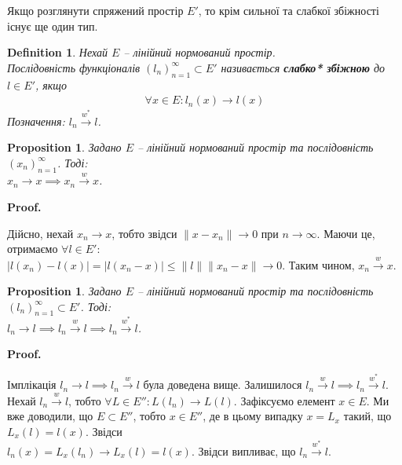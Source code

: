 \documentclass[a4paper, 10pt]{article}
\makeatletter
\theoremstyle{theoremdd}
\theoremstyle{theoremdd}
\newtheorem{definition}[theorem]{Definition}
\theoremstyle{theoremdd}
\theoremstyle{theoremdd}
\theoremstyle{theoremdd}
\newtheorem{proposition}[theorem]{Proposition}
\theoremstyle{theoremdd}
\theoremstyle{theoremdd}
\theoremstyle{theoremdd}
\newcommand{\toweak}{\overset{w}{\to}}
\newcommand{\toweakstar}{\overset{w^*}{\to}}
\renewenvironment{proof}[1][Proof.\\]{\par
\pushQED{\hfill \qed}%
\normalfont \topsep6\p@\@plus6\p@\relax
\trivlist
\item\relax
{\bfseries
#1\@addpunct{.}}\hspace\labelsep\ignorespaces
}{%
\popQED\endtrivlist\@endpefalse
}
\makeatother
\begin{document}
Якщо розглянути спряжений простір $E'$, то крім сильної та слабкої збіжності існує ще один тип.

\begin{definition}
Нехай $E$ -- лінійний нормований простір.\\
Послідовність функціоналів $(l_n)_{n=1}^\infty \subset E'$ називається \textbf{слабко* збіжною} до $l \in E'$, якщо
\begin{align*}
\forall x \in E: l_n(x) \to l(x)
\end{align*}
Позначення: $l_n \toweakstar l$.
\end{definition}

\begin{proposition}
Задано $E$ -- лінійний нормований простір та послідовність $(x_n)_{n=1}^\infty$. Тоді:\\
$x_n \to x \implies x_n \toweak x$.
\end{proposition}

\begin{proof}
Дійсно, нехай $x_n \to x$, тобто звідси $\|x-x_n\| \to 0$ при $n \to \infty$. Маючи це, отримаємо $\forall l \in E'$:\\
$|l(x_n)-l(x)| = |l(x_n-x)| \leq \|l\| \|x_n - x\| \to 0$. Таким чином, $x_n \toweak x$.
\end{proof}

\begin{proposition}
Задано $E$ -- лінійний нормований простір та послідовність $(l_n)_{n=1}^\infty \subset E'$. Тоді:\\
$l_n \to l \implies l_n \toweak l \implies l_n \toweakstar l$.
\end{proposition}

\begin{proof}
Імплікація $l_n \to l \implies l_n \toweak l$ була доведена вище. Залишилося $l_n \toweak l \implies l_n \toweakstar l$.\\
Нехай $l_n \toweak l$, тобто $\forall L \in E'': L(l_n) \to L(l)$. Зафіксуємо елемент $x \in E$. Ми вже доводили, що $E \subset E''$, тобто $x \in E''$, де в цьому випадку $x = L_x$ такий, що $L_x(l) = l(x)$. Звідси\\
$l_n(x) = L_x(l_n) \to L_x(l) = l(x)$. Звідси випливає, що $l_n \toweakstar l$.
\end{proof}
\end{document}

